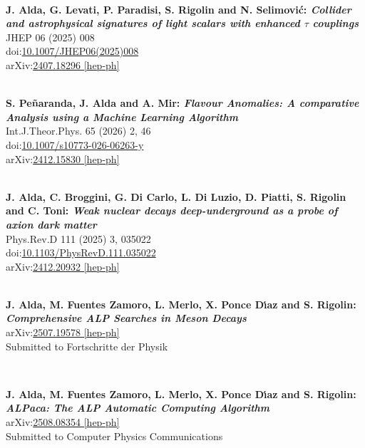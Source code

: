 \documentclass{cvf}
\begin{document}
~

\textbf{J. Alda, G. Levati, P. Paradisi, S. Rigolin and N. Selimovi\'c: \textit{Collider and astrophysical signatures of light scalars with enhanced $\tau$ couplings}}\\
JHEP 06 (2025) 008\\
doi:\href{https://doi.org/10.1007/JHEP06(2025)008}{10.1007/JHEP06(2025)008}\\
arXiv:\href{https://arxiv.org/abs/2407.18296}{2407.18296 [hep-ph]}\\

~

\textbf{S. Peñaranda, J. Alda and A. Mir: \textit{Flavour Anomalies: A comparative Analysis using a Machine Learning Algorithm}}\\
Int.J.Theor.Phys. 65 (2026) 2, 46\\
doi:\href{https://doi.org/10.1007/s10773-026-06263-y}{10.1007/s10773-026-06263-y}\\
arXiv:\href{https://arxiv.org/abs/2412.15830}{2412.15830 [hep-ph]}\\


~

\textbf{J. Alda, C. Broggini, G. Di Carlo, L. Di Luzio, D. Piatti, S. Rigolin and C. Toni: \textit{Weak nuclear decays deep-underground as a probe of axion dark matter}}\\
Phys.Rev.D 111 (2025) 3, 035022\\
doi:\href{https://doi.org/10.1103/PhysRevD.111.035022}{10.1103/PhysRevD.111.035022}\\
arXiv:\href{https://arxiv.org/abs/2412.20932}{2412.20932 [hep-ph]}\\


~

\textbf{J. Alda, M. Fuentes Zamoro, L. Merlo, X. Ponce D{\'\i}az and S. Rigolin: \textit{Comprehensive ALP Searches in Meson Decays}}\\
arXiv:\href{https://arxiv.org/abs/2507.19578}{2507.19578 [hep-ph]}\\
Submitted to Fortschritte der Physik

~

\textbf{J. Alda, M. Fuentes Zamoro, L. Merlo, X. Ponce D{\'\i}az and S. Rigolin: \textit{ALPaca: The ALP Automatic Computing Algorithm}}\\
arXiv:\href{https://arxiv.org/abs/2508.08354}{2508.08354 [hep-ph]}\\
Submitted to Computer Physics Communications

~
\end{document}
